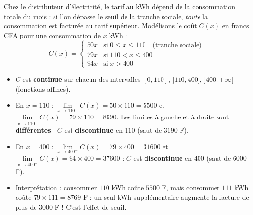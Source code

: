 \documentclass[11pt]{article}
\begin{document}
\begin{exemplebox}
Chez le distributeur d'électricité, le tarif au kWh dépend de la consommation totale du mois : si l'on dépasse le seuil de la tranche sociale, \emph{toute} la consommation est facturée au tarif supérieur. Modélisons le coût $C(x)$ en francs CFA pour une consommation de $x$ kWh :
\[
C(x) = \begin{cases}
50x & \text{si } 0 \le x \le 110 \quad\text{(tranche sociale)}\\
79x & \text{si } 110 < x \le 400\\
94x & \text{si } x > 400
\end{cases}
\]
\begin{itemize}
\item $C$ est \textbf{continue} sur chacun des intervalles $[0,110]$, $]110,400]$, $]400,+\infty[$ (fonctions affines).
\item En $x=110$ : $\lim\limits_{x\to 110^-}C(x)=50\times110=5500$ et $\lim\limits_{x\to 110^+}C(x)=79\times110=8690$. Les limites à gauche et à droite sont \textbf{différentes} : $C$ est \textbf{discontinue} en $110$ (saut de $3190$ F).
\item En $x=400$ : $\lim\limits_{x\to 400^-}C(x)=79\times400=31600$ et $\lim\limits_{x\to 400^+}C(x)=94\times400=37600$ : $C$ est \textbf{discontinue} en $400$ (saut de $6000$ F).
\item Interprétation : consommer $110$ kWh coûte $5500$ F, mais consommer $111$ kWh coûte $79\times111=8769$ F : un seul kWh supplémentaire augmente la facture de plus de $3000$ F ! C'est l'effet de seuil.
\end{itemize}
\end{exemplebox}
\end{document}
